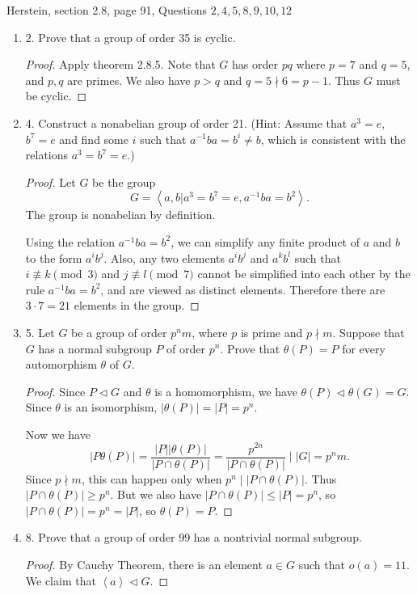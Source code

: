 
Herstein, section 2.8, page 91, Questions $2,4,5,8,9,10,12$
\begin{enumerate}
	\item 2. Prove that a group of order 35 is cyclic.
\begin{proof}
	Apply theorem 2.8.5. Note that $G$ has order $pq$ where $p = 7$ and $q = 5$, and $p,q$ are primes. We also have $p > q$ and $q  = 5 \nmid 6 = p-1$. Thus $G$ must be cyclic.
\end{proof}
\item 4. Construct a nonabelian group of order 21. (Hint: Assume that $a^3=e$, $b^7=e$ and find some $i$ such that $a^{-1} b a=b^i \neq b$, which is consistent with the relations $a^3=b^7=e$.)
\begin{proof}
	Let $G$ be the group
	\[
		G = \left\langle a, b | a^3 = b^7 = e, a^{-1} b a = b^2 \right\rangle 
	.\] 
	The group is nonabelian by definition.

	Using the relation $a^{-1} ba = b^2$, we can simplify any finite product of $a$ and $b$ to the form $a^i b^j$. Also, any two elements $a^ib^j$ and $a^kb^l$ such that $i\not\equiv k \pmod 3$ and $j \not\equiv l \pmod 7$ cannot be simplified into each other by the rule $a^{-1} ba = b^2$, and are viewed as distinct elements. Therefore there are $3 \cdot 7 = 21$ elements in the group.
\end{proof}
\item 5. Let $G$ be a group of order $p^n m$, where $p$ is prime and $p \nmid m$. Suppose that $G$ has a normal subgroup $P$ of order $p^{n}$. Prove that $\theta(P)=P$ for every automorphism $\theta$ of $G$.
\begin{proof}
	Since $P \triangleleft G$ and $\theta$ is a homomorphism, we have $\theta(P)\triangleleft \theta(G)=G$. Since $\theta$ is an isomorphism, $|\theta(P)| = |P| = p^n$.

	Now we have
	\[
		|P \theta(P)| = \frac{|P| |\theta(P)|}{|P \cap \theta(P)|} = \frac{p^{2n}}{|P \cap \theta(P)|} \mid |G| = p^n m
	.\] 
	Since $p \nmid m$, this can happen only when $p^n \mid |P \cap \theta(P)|$. Thus $|P \cap \theta(P)| \ge p^n$. But we also have $|P \cap \theta(P)| \le |P| = p^n$, so $|P \cap  \theta(P)| = p^n = |P|$, so $\theta(P) = P$.
\end{proof}
\item 8. Prove that a group of order 99 has a nontrivial normal subgroup.
\begin{proof}
	By Cauchy Theorem, there is an element $a \in G$ such that $o(a) = 11$. We claim that $\left\langle a \right\rangle \triangleleft G$.


\end{proof}
\end{enumerate}

